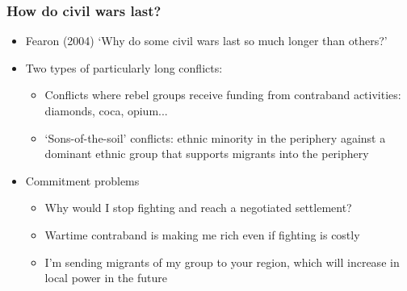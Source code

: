 \documentclass[aspectratio=43]{beamer}
\begin{document}
\begin{frame}
\frametitle{How  do civil wars last?}
\centering

\begin{itemize}
  \item Fearon (2004) `Why do some civil wars last so much longer than others?'
  \item Two types of particularly long conflicts:
  \begin{itemize}
    \item Conflicts where rebel groups receive funding from contraband activities: diamonds, coca, opium...
    \item `Sons-of-the-soil' conflicts: ethnic minority in the periphery against a dominant ethnic group that supports migrants into the periphery
  \end{itemize}
  \item<2-> Commitment problems
  \begin{itemize}
    \item Why would I stop fighting and reach a negotiated settlement?
    \item Wartime contraband is making me rich even if fighting is costly
    \item I'm sending migrants of my group to your region, which will increase in local power in the future
  \end{itemize}
\end{itemize}

\end{frame}
\end{document}
